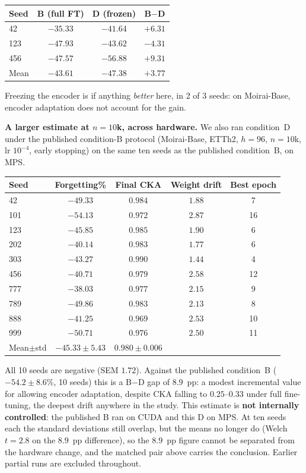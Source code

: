 \documentclass{article}
\begin{document}
\begin{center}
\small
\begin{tabular}{@{}lccc@{}}
\toprule
Seed & B (full FT) & D (frozen) & B$-$D \\
\midrule
42  & $-35.33$ & $-41.64$ & $+6.31$ \\
123 & $-47.93$ & $-43.62$ & $-4.31$ \\
456 & $-47.57$ & $-56.88$ & $+9.31$ \\
\midrule
Mean & $-43.61$ & $-47.38$ & $+3.77$ \\
\bottomrule
\end{tabular}
\end{center}

Freezing the encoder is if anything \emph{better} here, in 2 of 3 seeds: on Moirai-Base, encoder
adaptation does not account for the gain.

\textbf{A larger estimate at $n{=}10$k, across hardware.} We also ran condition~D under the
published condition-B protocol (Moirai-Base, ETTh2, $h{=}96$, $n{=}10$k, lr $10^{-4}$, early
stopping) on the same ten seeds as the published condition~B, on MPS.

\begin{center}
\small
\begin{tabular}{@{}lcccc@{}}
\toprule
Seed & Forgetting\% & Final CKA & Weight drift & Best epoch \\
\midrule
42  & $-49.33$ & $0.984$ & $1.88$ & 7 \\
101 & $-54.13$ & $0.972$ & $2.87$ & 16 \\
123 & $-45.85$ & $0.985$ & $1.90$ & 6 \\
202 & $-40.14$ & $0.983$ & $1.77$ & 6 \\
303 & $-43.27$ & $0.990$ & $1.44$ & 4 \\
456 & $-40.71$ & $0.979$ & $2.58$ & 12 \\
777 & $-38.03$ & $0.977$ & $2.15$ & 9 \\
789 & $-49.86$ & $0.983$ & $2.13$ & 8 \\
888 & $-41.25$ & $0.969$ & $2.53$ & 10 \\
999 & $-50.71$ & $0.976$ & $2.50$ & 11 \\
\midrule
Mean$\pm$std & $-45.33{\pm}5.43$ & $0.980{\pm}0.006$ & & \\
\bottomrule
\end{tabular}
\end{center}

All 10 seeds are negative (SEM $1.72$). Against the published condition~B ($-54.2{\pm}8.6$\%, 10
seeds) this is a B$-$D gap of $8.9$~pp: a modest incremental value for allowing encoder adaptation, despite CKA falling to
$0.25$--$0.33$ under full fine-tuning, the deepest drift anywhere in the study. This estimate is
\textbf{not internally controlled}: the published B ran on CUDA and this D on MPS. At ten seeds each
the standard deviations still overlap, but the means no longer do (Welch $t{=}2.8$ on the $8.9$~pp
difference), so the $8.9$~pp figure cannot be separated from the hardware change, and the matched
pair above carries the conclusion. Earlier partial runs are excluded throughout.
\end{document}
